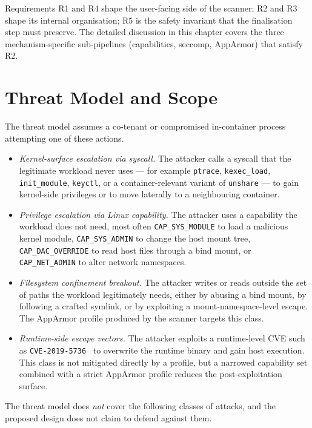Requirements R1 and R4 shape the user-facing side of the scanner; R2 and R3 shape its internal organisation; R5 is the safety invariant that the finalisation step must preserve. The detailed discussion in this chapter covers the three mechanism-specific sub-pipelines (capabilities, seccomp, AppArmor) that satisfy R2.

\section{Threat Model and Scope}\label{sec:design-threat}

The threat model assumes a co-tenant or compromised in-container process attempting one of these actions.

\begin{itemize}
    \item \emph{Kernel-surface escalation via syscall.} The attacker calls a syscall that the legitimate workload never uses --- for example \texttt{ptrace}, \texttt{kexec\_load}, \texttt{init\_module}, \texttt{keyctl}, or a container-relevant variant of \texttt{unshare} --- to gain kernel-side privileges or to move laterally to a neighbouring container.
    \item \emph{Privilege escalation via Linux capability.} The attacker uses a capability the workload does not need, most often \texttt{CAP\_SYS\_MODULE} to load a malicious kernel module, \texttt{CAP\_SYS\_ADMIN} to change the host mount tree, \texttt{CAP\_DAC\_OVERRIDE} to read host files through a bind mount, or \texttt{CAP\_NET\_ADMIN} to alter network namespaces.
    \item \emph{Filesystem confinement breakout.} The attacker writes or reads outside the set of paths the workload legitimately needs, either by abusing a bind mount, by following a crafted symlink, or by exploiting a mount-namespace-level escape. The AppArmor profile produced by the scanner targets this class.
    \item \emph{Runtime-side escape vectors.} The attacker exploits a runtime-level CVE such as \texttt{CVE-2019-5736}~\cite{cve2019} to overwrite the runtime binary and gain host execution. This class is not mitigated directly by a profile, but a narrowed capability set combined with a strict AppArmor profile reduces the post-exploitation surface.
\end{itemize}

The threat model does \emph{not} cover the following classes of attacks, and the proposed design does not claim to defend against them.

